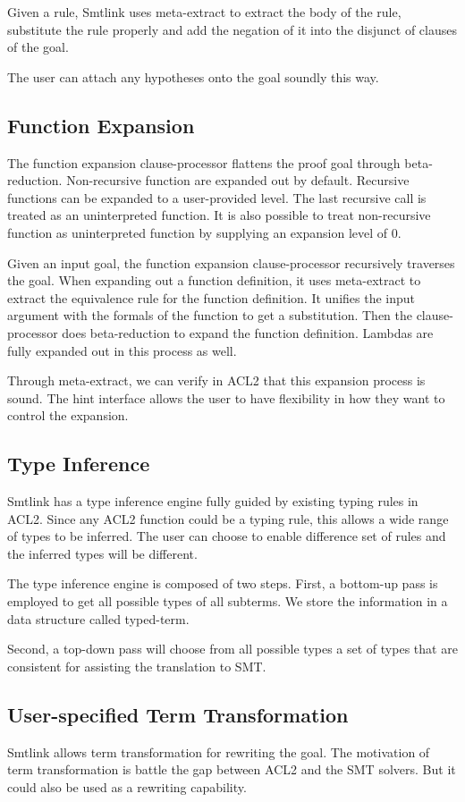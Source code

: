 Given a rule, Smtlink uses meta-extract to extract the body of the rule,
substitute the rule properly and add the negation of it into the disjunct of
clauses of the goal.

The user can attach any hypotheses onto the goal soundly this way.

\subsection{Function Expansion}
The function expansion clause-processor flattens the proof goal through
beta-reduction. Non-recursive function are expanded out by default. Recursive
functions can be expanded to a user-provided level. The last recursive call is
treated as an uninterpreted function. It is also possible to treat non-recursive
function as uninterpreted function by supplying an expansion level of 0.

Given an input goal, the function expansion clause-processor recursively
traverses the goal. When expanding out a function definition, it uses
meta-extract to extract the equivalence rule for the function definition.
It unifies the input argument with the formals of the function to get a
substitution. Then the clause-processor does beta-reduction to expand the
function definition. Lambdas are fully expanded out in this process as well.

Through meta-extract, we can verify in ACL2 that this expansion process is
sound. The hint interface allows the user to have flexibility in how they want
to control the expansion. 

\subsection{Type Inference}
Smtlink has a type inference engine fully guided by existing typing rules in
ACL2. Since any ACL2 function could be a typing rule, this allows a wide range
of types to be inferred. The user can choose to enable difference set of rules
and the inferred types will be different.

The type inference engine is composed of two steps. First, a bottom-up pass is
employed to get all possible types of all subterms. We store the information in
a data structure called typed-term.

Second, a top-down pass will choose from all possible types a set of types that
are consistent for assisting the translation to SMT.

\subsection{User-specified Term Transformation}
Smtlink allows term transformation for rewriting the goal. The motivation of
term transformation is battle the gap between ACL2 and the SMT solvers. But it
could also be used as a rewriting capability.

